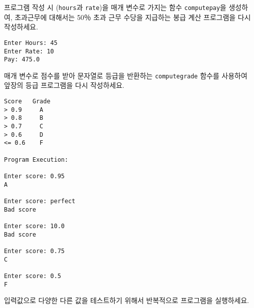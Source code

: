 \begin{ex}

프로그램 작성 시 ({\tt hours}과 {\tt rate})을 매개 변수로 가지는 함수 {\tt computepay}을 생성하여,
초과근무에 대해서는 50％ 초과 근무 수당을 지급하는 봉급 계산 프로그램을 다시 작성하세요.

\begin{verbatim}
Enter Hours: 45
Enter Rate: 10
Pay: 475.0
\end{verbatim}
\end{ex}

\begin{ex}

매개 변수로 점수를 받아 문자열로 등급을 반환하는 {\tt computegrade} 함수를 사용하여
앞장의 등급 프로그램을 다시 작성하세요.

\begin{verbatim}
Score   Grade
> 0.9     A
> 0.8     B
> 0.7     C
> 0.6     D
<= 0.6    F

Program Execution:

Enter score: 0.95
A

Enter score: perfect
Bad score

Enter score: 10.0
Bad score

Enter score: 0.75
C

Enter score: 0.5
F
\end{verbatim}

입력값으로 다양한 다른 값을 테스트하기 위해서 반복적으로 프로그램을 실행하세요.

\end{ex}


